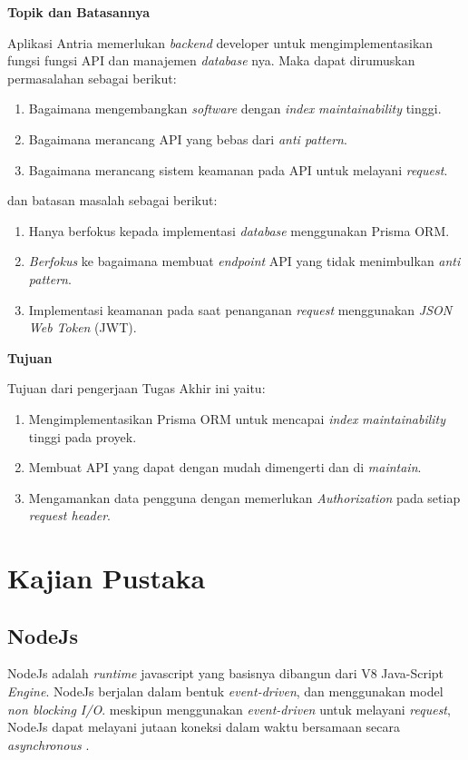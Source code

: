 \noindent\textbf{Topik dan Batasannya}

Aplikasi Antria memerlukan \textit{backend} developer untuk mengimplementasikan fungsi fungsi API dan manajemen \textit{database} nya. Maka dapat dirumuskan permasalahan sebagai berikut:
\begin{enumerate}
  \item Bagaimana mengembangkan \textit{software} dengan \textit{index} \textit{maintainability} tinggi.
  \item Bagaimana merancang API yang bebas dari \textit{anti pattern}.
  \item Bagaimana merancang sistem keamanan pada API untuk melayani \textit{request}.
\end{enumerate}
dan batasan masalah sebagai berikut:
\begin{enumerate}
  \item Hanya berfokus kepada implementasi \textit{database} menggunakan Prisma ORM.
  \item \textit{Berfokus} ke bagaimana membuat \textit{endpoint} API yang tidak menimbulkan \textit{anti pattern}.
  \item Implementasi keamanan pada saat penanganan \textit{request} menggunakan \textit{JSON Web Token} (JWT).
\end{enumerate}


\noindent\textbf{Tujuan}

Tujuan dari pengerjaan Tugas Akhir ini yaitu:
\begin{enumerate}
  \item Mengimplementasikan Prisma ORM untuk mencapai \textit{index} \textit{maintainability} tinggi pada proyek.
  \item Membuat API yang dapat dengan mudah dimengerti dan di \textit{maintain}.
  \item Mengamankan data pengguna dengan memerlukan \textit{Authorization} pada setiap \textit{request header}.
  
\end{enumerate}


\newpage

\section{Kajian Pustaka}
\subsection{NodeJs}
NodeJs adalah \textit{runtime} javascript yang basisnya dibangun dari V8 Java-Script \textit{Engine}. NodeJs berjalan dalam bentuk \textit{event-driven}, dan menggunakan model \textit{non blocking I/O}. meskipun menggunakan \textit{event-driven} untuk melayani \textit{request}, NodeJs dapat melayani jutaan koneksi dalam waktu bersamaan secara \textit{asynchronous} \cite{shah2017node}.

